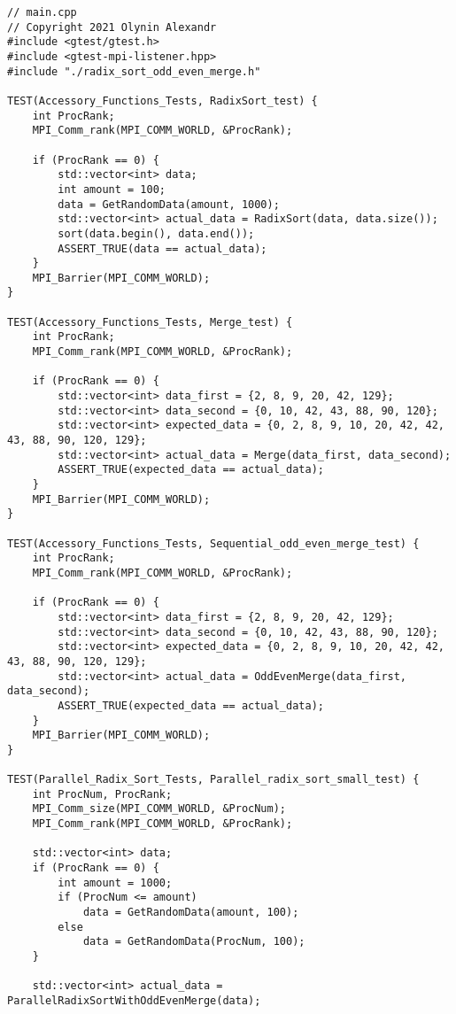 \documentclass[12pt]{report}
\begin{document}
\begin{lstlisting}
// main.cpp
// Copyright 2021 Olynin Alexandr
#include <gtest/gtest.h>
#include <gtest-mpi-listener.hpp>
#include "./radix_sort_odd_even_merge.h"

TEST(Accessory_Functions_Tests, RadixSort_test) {
    int ProcRank;
    MPI_Comm_rank(MPI_COMM_WORLD, &ProcRank);

    if (ProcRank == 0) {
        std::vector<int> data;
        int amount = 100;
        data = GetRandomData(amount, 1000);
        std::vector<int> actual_data = RadixSort(data, data.size());
        sort(data.begin(), data.end());
        ASSERT_TRUE(data == actual_data);
    }
    MPI_Barrier(MPI_COMM_WORLD);
}

TEST(Accessory_Functions_Tests, Merge_test) {
    int ProcRank;
    MPI_Comm_rank(MPI_COMM_WORLD, &ProcRank);

    if (ProcRank == 0) {
        std::vector<int> data_first = {2, 8, 9, 20, 42, 129};
        std::vector<int> data_second = {0, 10, 42, 43, 88, 90, 120};
        std::vector<int> expected_data = {0, 2, 8, 9, 10, 20, 42, 42, 43, 88, 90, 120, 129};
        std::vector<int> actual_data = Merge(data_first, data_second);
        ASSERT_TRUE(expected_data == actual_data);
    }
    MPI_Barrier(MPI_COMM_WORLD);
}

TEST(Accessory_Functions_Tests, Sequential_odd_even_merge_test) {
    int ProcRank;
    MPI_Comm_rank(MPI_COMM_WORLD, &ProcRank);

    if (ProcRank == 0) {
        std::vector<int> data_first = {2, 8, 9, 20, 42, 129};
        std::vector<int> data_second = {0, 10, 42, 43, 88, 90, 120};
        std::vector<int> expected_data = {0, 2, 8, 9, 10, 20, 42, 42, 43, 88, 90, 120, 129};
        std::vector<int> actual_data = OddEvenMerge(data_first, data_second);
        ASSERT_TRUE(expected_data == actual_data);
    }
    MPI_Barrier(MPI_COMM_WORLD);
}

TEST(Parallel_Radix_Sort_Tests, Parallel_radix_sort_small_test) {
    int ProcNum, ProcRank;
    MPI_Comm_size(MPI_COMM_WORLD, &ProcNum);
    MPI_Comm_rank(MPI_COMM_WORLD, &ProcRank);

    std::vector<int> data;
    if (ProcRank == 0) {
        int amount = 1000;
        if (ProcNum <= amount)
            data = GetRandomData(amount, 100);
        else
            data = GetRandomData(ProcNum, 100);
    }

    std::vector<int> actual_data = ParallelRadixSortWithOddEvenMerge(data);


\end{lstlisting}
\end{document}
